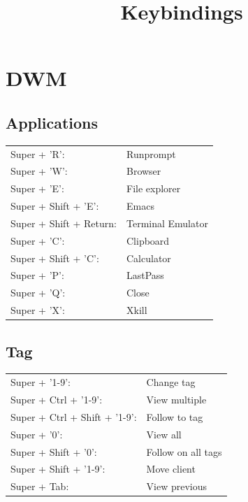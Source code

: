 \documentclass[11pt]{article}
\title{Keybindings}
\begin{document}
\maketitle

\section{DWM}
\label{sec:org09fb7af}
\subsection{Applications}
\label{sec:org5a4a356}
\begin{flushleft}
\begin{tabular}{ll}
Super + 'R': & Runprompt\\
Super + 'W': & Browser\\
Super + 'E': & File explorer\\
Super + Shift + 'E': & Emacs\\
Super + Shift + Return: & Terminal Emulator\\
Super + 'C': & Clipboard\\
Super + Shift + 'C': & Calculator\\
Super + 'P': & LastPass\\
Super + 'Q': & Close\\
Super + 'X': & Xkill\\
\end{tabular}
\end{flushleft}
\subsection{Tag}
\label{sec:org8b7c415}
\begin{flushleft}
\begin{tabular}{ll}
Super + '1-9': & Change tag\\
Super + Ctrl + '1-9': & View multiple\\
Super + Ctrl + Shift + '1-9': & Follow to tag\\
Super + '0': & View all\\
Super + Shift + '0': & Follow on all tags\\
Super + Shift + '1-9': & Move client\\
Super + Tab: & View previous\\
\end{tabular}
\end{flushleft}
\end{document}
